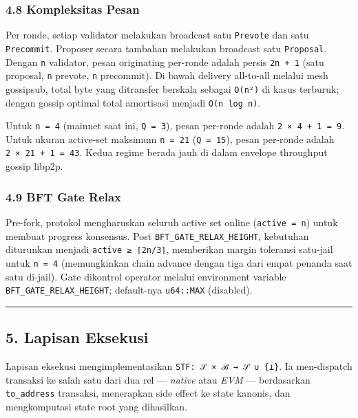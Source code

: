 \documentclass[11pt,a4paper]{article}
\begin{document}
\hypertarget{kompleksitas-pesan}{%
\subsubsection{4.8 Kompleksitas Pesan}\label{kompleksitas-pesan}}

Per ronde, setiap validator melakukan broadcast satu \texttt{Prevote} dan satu \texttt{Precommit}. Proposer secara tambahan melakukan broadcast satu \texttt{Proposal}. Dengan \texttt{n} validator, pesan originating per-ronde adalah persis \texttt{2n\ +\ 1} (satu proposal, \texttt{n} prevote, \texttt{n} precommit). Di bawah delivery all-to-all melalui mesh gossipsub, total byte yang ditransfer berskala sebagai \texttt{O(n²)} di kasus terburuk; dengan gossip optimal total amortisasi menjadi \texttt{O(n\ log\ n)}.

Untuk \texttt{n\ =\ 4} (mainnet saat ini, \texttt{Q\ =\ 3}), pesan per-ronde adalah \texttt{2\ ×\ 4\ +\ 1\ =\ 9}. Untuk ukuran active-set maksimum \texttt{n\ =\ 21} (\texttt{Q\ =\ 15}), pesan per-ronde adalah \texttt{2\ ×\ 21\ +\ 1\ =\ 43}. Kedua regime berada jauh di dalam envelope throughput gossip libp2p.

\hypertarget{bft-gate-relax}{%
\subsubsection{4.9 BFT Gate Relax}\label{bft-gate-relax}}

Pre-fork, protokol mengharuskan seluruh active set online (\texttt{active\ =\ n}) untuk membuat progress konsensus. Post \texttt{BFT\_GATE\_RELAX\_HEIGHT}, kebutuhan diturunkan menjadi \texttt{active\ ≥\ ⌈2n/3⌉}, memberikan margin toleransi satu-jail untuk \texttt{n\ =\ 4} (memungkinkan chain advance dengan tiga dari empat penanda saat satu di-jail). Gate dikontrol operator melalui environment variable \texttt{BFT\_GATE\_RELAX\_HEIGHT}; default-nya \texttt{u64::MAX} (disabled).

\begin{center}\rule{0.5\linewidth}{0.5pt}\end{center}

\hypertarget{lapisan-eksekusi}{%
\subsection{5. Lapisan Eksekusi}\label{lapisan-eksekusi}}

Lapisan eksekusi mengimplementasikan \texttt{STF:\ 𝒮\ ×\ ℬ\ →\ 𝒮\ ∪\ \{⊥\}}. Ia men-dispatch transaksi ke salah satu dari dua rel --- \emph{native} atau \emph{EVM} --- berdasarkan \texttt{to\_address} transaksi, menerapkan side effect ke state kanonis, dan mengkomputasi state root yang dihasilkan.
\end{document}
